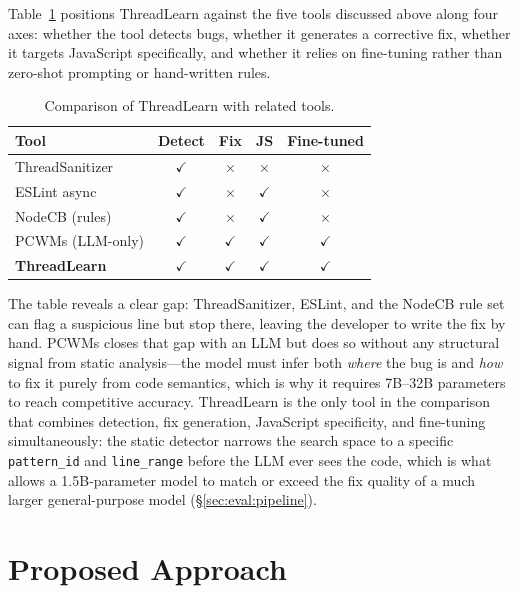 \documentclass[runningheads]{llncs}
\begin{document}
Table~\ref{tab:related} positions ThreadLearn against the five tools
discussed above along four axes: whether the tool detects bugs, whether it
generates a corrective fix, whether it targets JavaScript specifically,
and whether it relies on fine-tuning rather than zero-shot prompting or
hand-written rules.

\begin{table}[H]
  \centering
  \caption{Comparison of ThreadLearn with related tools.}
  \label{tab:related}
  \begin{tabular}{@{}lcccc@{}}
    \toprule
    \textbf{Tool} & \textbf{Detect} & \textbf{Fix} & \textbf{JS} & \textbf{Fine-tuned} \\
    \midrule
    ThreadSanitizer      & $\checkmark$ & $\times$     & $\times$     & $\times$ \\
    ESLint async         & $\checkmark$ & $\times$     & $\checkmark$ & $\times$ \\
    NodeCB (rules)       & $\checkmark$ & $\times$     & $\checkmark$ & $\times$ \\
    PCWMs (LLM-only)     & $\checkmark$ & $\checkmark$ & $\checkmark$ & $\checkmark$ \\
    \textbf{ThreadLearn} & $\checkmark$ & $\checkmark$ & $\checkmark$ & $\checkmark$ \\
    \bottomrule
  \end{tabular}
\end{table}

The table reveals a clear gap: ThreadSanitizer, ESLint, and the NodeCB
rule set can flag a suspicious line but stop there, leaving the developer
to write the fix by hand.
PCWMs closes that gap with an LLM but does so without any structural
signal from static analysis---the model must infer both \emph{where} the
bug is and \emph{how} to fix it purely from code semantics, which is why
it requires 7B--32B parameters to reach competitive accuracy.
ThreadLearn is the only tool in the comparison that combines detection,
fix generation, JavaScript specificity, and fine-tuning simultaneously: the
static detector narrows the search space to a specific
\texttt{pattern\_id} and \texttt{line\_range} before the LLM ever sees the
code, which is what allows a 1.5B-parameter model to match or exceed the
fix quality of a much larger general-purpose model (\S\ref{sec:eval:pipeline}).

\section{Proposed Approach}
\label{sec:design}
\end{document}
